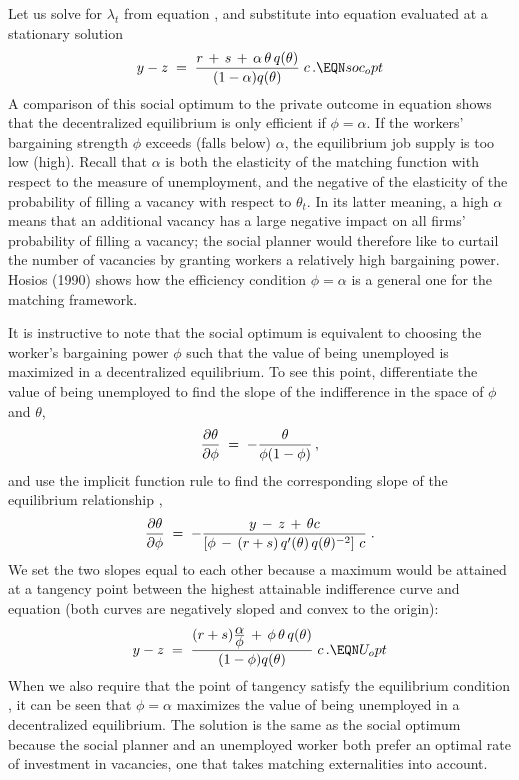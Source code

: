 Let us solve for $\lambda_t$ from equation , and substitute
into equation  evaluated at a stationary solution
$$
y-z \;=\; {r\,+\,s\,+\,\alpha\,\theta\,q(\theta) \over
                    (1-\alpha) q(\theta) } \; c \,.            \EQN soc_opt
$$
A comparison of this social optimum to the private outcome in equation
 shows that the decentralized equilibrium is only efficient
if $\phi = \alpha$. If the workers' bargaining strength $\phi$ exceeds
(falls below) $\alpha$, the equilibrium job supply is too low (high).
Recall that $\alpha$ is both the elasticity of the matching function with
respect to the measure of unemployment, and the negative of the
elasticity of the probability of filling a vacancy with respect to
$\theta_t$. In its latter meaning, a high $\alpha$ means that
an additional vacancy has a large negative impact on all firms'
probability of filling a vacancy; the social planner would therefore
like to curtail the number of vacancies by granting workers a relatively
high bargaining power. Hosios (1990) shows how the efficiency condition
$\phi=\alpha$ is a general one for the matching framework.

It is instructive to note that the social optimum is equivalent
to choosing the worker's bargaining power $\phi$ such that the value of
being unemployed is maximized in a decentralized equilibrium. To see
this point, differentiate the value of being unemployed 
to find the slope of the indifference in the space of $\phi$ and
$\theta$,
$$
{ \partial \theta \over \partial \phi} \;=\; - {\theta \over \phi (1-\phi)}\,,
$$
and use the implicit function rule to find the corresponding slope of
the equilibrium relationship ,
$$
{ \partial \theta \over \partial \phi} \;=\; - {y\,-\,z\,+\,\theta c \over
\left[\phi \,-\, (r+s)\, q'(\theta)\, q(\theta)^{-2} \right] \, c }\;.
$$
We set the two slopes equal to each other because a maximum would be
attained at a tangency point between the highest attainable
indifference curve and equation  (both curves are negatively
sloped and convex to the origin):
$$
y-z \;=\; {(r+s) {\displaystyle \alpha \over \displaystyle  \phi}
           \,+\,\phi\,\theta\,q(\theta) \over
                    (1-\phi) q(\theta) } \; c \,.            \EQN U_opt
$$
When we also require that the point of tangency satisfy the
equilibrium condition , it can be seen that
$\phi = \alpha$ maximizes the value of being unemployed in a
decentralized equilibrium. The solution is the same as the
social optimum because the social planner and an unemployed
worker both prefer an optimal rate of investment
in vacancies, one that takes matching externalities into account.

